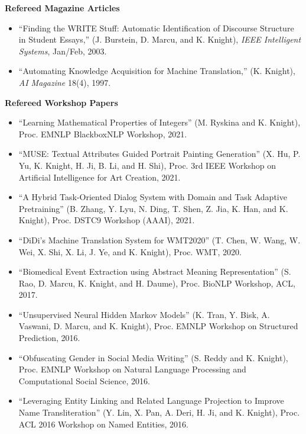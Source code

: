 \noindent
{\bf Refereed Magazine Articles}
\begin{itemize}
\item ``Finding the WRITE Stuff: Automatic Identification of Discourse 
Structure in Student Essays,'' (J. Burstein, D. Marcu, and K. Knight), 
{\em IEEE Intelligent Systems}, Jan/Feb, 2003.

\item ``Automating Knowledge Acquisition for Machine Translation,''
(K. Knight),
{\em AI Magazine} 18(4), 1997.

\end{itemize}

\noindent
{\bf Refereed Workshop Papers}

\begin{itemize}
\item ``Learning Mathematical Properties of Integers'' (M. Ryskina and K. Knight), Proc. EMNLP BlackboxNLP Workshop, 2021. 

\item ``MUSE: Textual Attributes Guided Portrait Painting Generation'' (X. Hu, P. Yu, K. Knight, H. Ji, B. Li, and H. Shi), Proc. 3rd IEEE Workshop on Artificial Intelligence for Art Creation, 2021. 

\item ``A Hybrid Task-Oriented Dialog System with Domain and Task Adaptive Pretraining'' (B. Zhang, Y. Lyu, N. Ding, T. Shen, Z. Jia, K. Han, and K. Knight), Proc. DSTC9 Workshop (AAAI), 2021. 

\item ``DiDi's Machine Translation System for WMT2020'' (T. Chen, W. Wang, W. Wei, X. Shi, X. Li, J. Ye, and K. Knight), Proc. WMT, 2020. 

\item ``Biomedical Event Extraction using Abstract Meaning Representation'' (S. Rao, D. Marcu, K. Knight, and H. Daume), Proc. BioNLP Workshop, ACL, 2017. 

\item ``Unsupervised Neural Hidden Markov Models'' (K. Tran, Y. Bisk, A. Vaswani, D. Marcu, and K. Knight), Proc. EMNLP Workshop on Structured Prediction, 2016. 
\item ``Obfuscating Gender in Social Media Writing'' (S. Reddy and K. Knight), Proc. EMNLP Workshop on Natural Language Processing and Computational Social Science, 2016. 

\item ``Leveraging Entity Linking and Related Language Projection to Improve Name Transliteration'' (Y. Lin, X. Pan, A. Deri, H. Ji, and K. Knight), Proc. ACL 2016 Workshop on Named Entities, 2016. 


\end{itemize}
